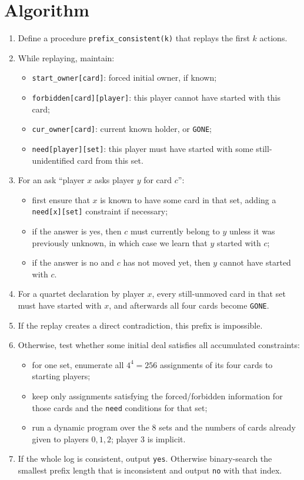 \documentclass[11pt]{article}
\begin{document}
\section*{Algorithm}

\begin{enumerate}[leftmargin=*]
    \item Define a procedure \texttt{prefix\_consistent(k)} that replays the first $k$ actions.
    \item While replaying, maintain:
    \begin{itemize}[leftmargin=*]
        \item \texttt{start\_owner[card]}: forced initial owner, if known;
        \item \texttt{forbidden[card][player]}: this player cannot have started with this card;
        \item \texttt{cur\_owner[card]}: current known holder, or \texttt{GONE};
        \item \texttt{need[player][set]}: this player must have started with some still-unidentified card
        from this set.
    \end{itemize}
    \item For an ask ``player $x$ asks player $y$ for card $c$'':
    \begin{itemize}[leftmargin=*]
        \item first ensure that $x$ is known to have some card in that set, adding a
        \texttt{need[x][set]} constraint if necessary;
        \item if the answer is yes, then $c$ must currently belong to $y$ unless it was previously
        unknown, in which case we learn that $y$ started with $c$;
        \item if the answer is no and $c$ has not moved yet, then $y$ cannot have started with $c$.
    \end{itemize}
    \item For a quartet declaration by player $x$, every still-unmoved card in that set must have
    started with $x$, and afterwards all four cards become \texttt{GONE}.
    \item If the replay creates a direct contradiction, this prefix is impossible.
    \item Otherwise, test whether some initial deal satisfies all accumulated constraints:
    \begin{itemize}[leftmargin=*]
        \item for one set, enumerate all $4^4 = 256$ assignments of its four cards to starting players;
        \item keep only assignments satisfying the forced/forbidden information for those cards and
        the \texttt{need} conditions for that set;
        \item run a dynamic program over the $8$ sets and the numbers of cards already given to
        players $0,1,2$; player $3$ is implicit.
    \end{itemize}
    \item If the whole log is consistent, output \texttt{yes}. Otherwise binary-search the smallest
    prefix length that is inconsistent and output \texttt{no} with that index.
\end{enumerate}
\end{document}
